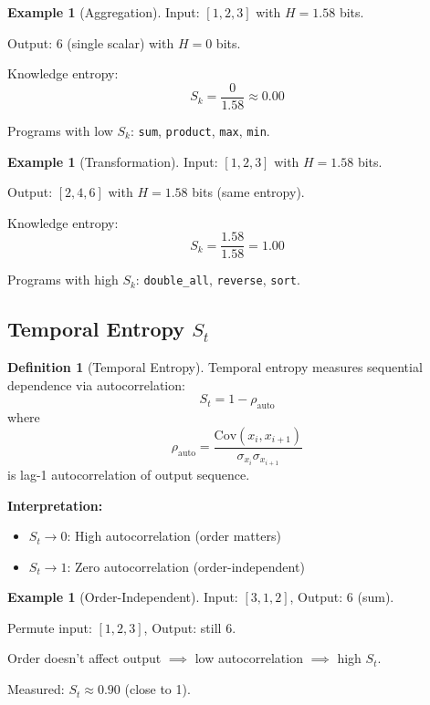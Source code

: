 \documentclass[twocolumn,10pt]{article}
\theoremstyle{definition}
\newtheorem{definition}[theorem]{Definition}
\newtheorem{example}[theorem]{Example}
\theoremstyle{remark}
\newcommand{\Sk}{S_k}
\newcommand{\St}{S_t}
\begin{document}
\begin{example}[Aggregation]
Input: $[1,2,3]$ with $H = 1.58$ bits.

Output: $6$ (single scalar) with $H = 0$ bits.

Knowledge entropy:
\begin{equation}
\Sk = \frac{0}{1.58} \approx 0.00
\end{equation}

Programs with low $\Sk$: \texttt{sum}, \texttt{product}, \texttt{max}, \texttt{min}.
\end{example}

\begin{example}[Transformation]
Input: $[1,2,3]$ with $H = 1.58$ bits.

Output: $[2,4,6]$ with $H = 1.58$ bits (same entropy).

Knowledge entropy:
\begin{equation}
\Sk = \frac{1.58}{1.58} = 1.00
\end{equation}

Programs with high $\Sk$: \texttt{double\_all}, \texttt{reverse}, \texttt{sort}.
\end{example}

\subsection{Temporal Entropy $\St$}

\begin{definition}[Temporal Entropy]
\label{def:temporal_entropy}
Temporal entropy measures sequential dependence via autocorrelation:
\begin{equation}
\St = 1 - \rho_{\text{auto}}
\end{equation}
where
\begin{equation}
\rho_{\text{auto}} = \frac{\text{Cov}(x_i, x_{i+1})}{\sigma_{x_i} \sigma_{x_{i+1}}}
\end{equation}
is lag-1 autocorrelation of output sequence.
\end{definition}

\noindent\textbf{Interpretation:}
\begin{itemize}
\item $\St \to 0$: High autocorrelation (order matters)
\item $\St \to 1$: Zero autocorrelation (order-independent)
\end{itemize}

\begin{example}[Order-Independent]
Input: $[3,1,2]$, Output: $6$ (sum).

Permute input: $[1,2,3]$, Output: still $6$.

Order doesn't affect output $\implies$ low autocorrelation $\implies$ high $\St$.

Measured: $\St \approx 0.90$ (close to 1).
\end{example}
\end{document}
